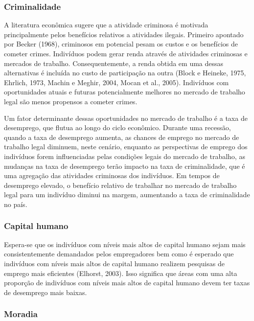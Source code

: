 \documentclass[]{article}
\begin{document}
\subsubsection{Criminalidade}\label{criminalidade}

A literatura econômica sugere que a atividade criminosa é motivada
principalmente pelos benefícios relativos a atividades ilegais. Primeiro
apontado por Becker (1968), criminosos em potencial pesam os custos e os
benefícios de cometer crimes. Indivíduos podem gerar renda através de
atividades criminosas e mercados de trabalho. Consequentemente, a renda
obtida em uma dessas alternativas é incluída no custo de participação na
outra (Block e Heineke, 1975, Ehrlich, 1973, Machin e Meghir, 2004,
Mocan et al., 2005). Indivíduos com oportunidades atuais e futuras
potencialmente melhores no mercado de trabalho legal são menos propensos
a cometer crimes.

Um fator determinante dessas oportunidades no mercado de trabalho é a
taxa de desemprego, que flutua ao longo do ciclo econômico. Durante uma
recessão, quando a taxa de desemprego aumenta, as chances de emprego no
mercado de trabalho legal diminuem, neste cenário, enquanto as
perspectivas de emprego dos indivíduos forem influenciadas pelas
condições legais do mercado de trabalho, as mudanças na taxa de
desemprego terão impacto na taxa de criminalidade, que é uma agregação
das atividades criminosas dos indivíduos. Em tempos de desemprego
elevado, o benefício relativo de trabalhar no mercado de trabalho legal
para um indivíduo diminui na margem, aumentando a taxa de criminalidade
no país.

\subsubsection{Capital humano}\label{capital-humano}

Espera-se que os indivíduos com níveis mais altos de capital humano
sejam mais consistentemente demandados pelos empregadores bem como é
esperado que indivíduos com níveis mais altos de capital humano realizem
pesquisas de emprego mais eficientes (Elhorst, 2003). Isso significa que
áreas com uma alta proporção de indivíduos com níveis mais altos de
capital humano devem ter taxas de desemprego mais baixas.

\subsubsection{Moradia}\label{moradia}
\end{document}
